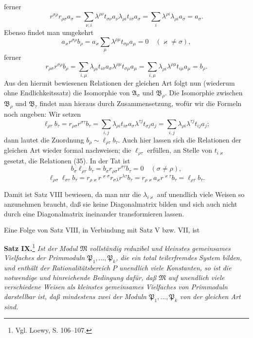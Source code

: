 \documentclass[11pt]{article}
\begin{document}
ferner
\[
 r^{\sigma\rho}r_{\rho\sigma}a_\sigma
 =\sum_{\nu,i}\lambda^{\rho\nu}t_{\sigma\nu}a_\nu\lambda_{\rho i}t_{i\sigma}a_\sigma
 =\sum_i\lambda^{\rho i}\lambda_{\rho i}a_\sigma=a_\sigma.
\]
Ebenso findet man umgekehrt
\[
 a_\varkappa r^{\sigma\rho}b_\rho
 =a_\varkappa\sum_\mu\lambda^{\rho\mu}t_{\sigma\mu}a_\mu=0
 \quad(\varkappa\ne\sigma),
\]
ferner
\[
 r_{\rho\sigma}r^{\sigma\rho}b_\rho
 =\sum_{i,\mu}\lambda_{\rho i}t_{i\sigma}a_\sigma\lambda^{\rho\mu}t_{\sigma\mu}a_\mu
 =\sum_{i,\mu}\lambda_{\rho i}\lambda^{\rho\mu}t_{i\mu}a_\mu=b_\rho.
\]
Aus den hiermit bewiesenen Relationen der gleichen Art folgt nun (wiederum ohne Endlichkeitssatz) die Isomorphie von $\mathfrak A_\sigma$ und $\mathfrak B_\rho$. Die Isomorphie zwischen $\mathfrak B_\rho$ und $\mathfrak B_\tau$ findet man hieraus durch Zusammensetzung, wofür wir die Formeln noch angeben: Wir setzen
\[
 \ell_{\rho\tau}b_\tau=r_{\rho\sigma}r^{\sigma\tau}b_\tau
 =\sum_{i,j}\lambda_{\rho i}t_{i\sigma}a_\sigma\lambda^{\tau j}t_{\sigma j}a_j
 =\sum_{i,j}\lambda_{\rho i}\lambda^{\tau j}t_{ij}a_j;
\]
dann lautet die Zuordnung $b_\rho\sim\ell_{\rho\tau}b_\tau$. Auch hier lassen sich die Relationen der gleichen Art wieder formal nachweisen; die $\ell_{\rho\tau}$ erfüllen, an Stelle von $t_{i\varkappa}$ gesetzt, die Relationen (35). In der Tat ist
\[
 b_\sigma\ell_{\rho\tau}b_\tau=b_\sigma r_{\rho\sigma}r^{\sigma\tau}b_\tau=0\quad(\sigma\ne\rho),
\]
\[
 \ell_{\rho\sigma}\ell_{\sigma\tau}b_\tau=r_{\rho\varkappa}r^{\varkappa\sigma}r_{\sigma\lambda}r^{\lambda\tau}b_\tau
 =r_{\rho\varkappa}a_\varkappa r^{\varkappa\tau}b_\tau=\ell_{\rho\tau}b_\tau.
\]

Damit ist Satz VIII bewiesen, da man nur die $\lambda_{i\varkappa}$ auf unendlich viele Weisen so anzunehmen braucht, daß sie keine Diagonalmatrix bilden und sich auch nicht durch eine Diagonalmatrix ineinander transformieren lassen.

Eine Folge von Satz VIII, in Verbindung mit Satz V bzw. VII, ist

\textbf{Satz IX.}\footnote{Vgl. Loewy, S. 106--107.} \emph{Ist der Modul $\mathfrak M$ vollständig reduzibel und kleinstes gemeinsames Vielfaches der Primmoduln $\mathfrak P_1,
\ldots,
\mathfrak P_k$, die ein total teilerfremdes System bilden, und enthält der Rationalitätsbereich $P$ unendlich viele Konstanten, so ist die notwendige und hinreichende Bedingung dafür, daß $\mathfrak M$ auf unendlich viele verschiedene Weisen als kleinstes gemeinsames Vielfaches von Primmoduln darstellbar ist, daß mindestens zwei der Moduln $\mathfrak P_1,
\ldots,
\mathfrak P_k$ von der gleichen Art sind.}
\end{document}
